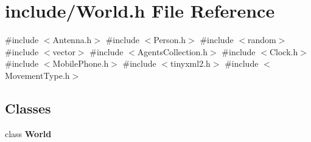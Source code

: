 \section{include/\+World.h File Reference}
\label{_world_8h}
{\ttfamily \#include $<$Antenna.\+h$>$}\newline
{\ttfamily \#include $<$Person.\+h$>$}\newline
{\ttfamily \#include $<$random$>$}\newline
{\ttfamily \#include $<$vector$>$}\newline
{\ttfamily \#include $<$Agents\+Collection.\+h$>$}\newline
{\ttfamily \#include $<$Clock.\+h$>$}\newline
{\ttfamily \#include $<$Mobile\+Phone.\+h$>$}\newline
{\ttfamily \#include $<$tinyxml2.\+h$>$}\newline
{\ttfamily \#include $<$Movement\+Type.\+h$>$}\newline
\subsection*{Classes}
\begin{DoxyCompactItemize}
\item 
class \textbf{ World}
\end{DoxyCompactItemize}
